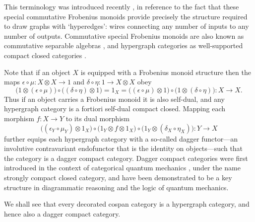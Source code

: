 This terminology was introduced recently \cite{Ki}, in reference to the fact
that these special commutative Frobenius monoids provide precisely the structure
required to draw graphs with `hyperedges': wires connecting any number of
inputs to any number of outputs. Commutative special Frobenius monoids are also
known as commutative separable algebras \cite{RSW}, and hypergraph categories as
well-supported compact closed categories \cite{Ca}.

Note that if an object $X$ is equipped with a Frobenius monoid structure then
the maps $\epsilon \circ \mu\colon  X \otimes X \longrightarrow 1$ and $\delta \circ
\eta\colon  1 \longrightarrow X \otimes X$ obey 
\[
  \big(1 \otimes (\epsilon \circ \mu)\big) \circ \big((\delta \circ \eta)
  \otimes 1\big) = 1_X = \big((\epsilon \circ \mu) \otimes 1\big) \circ \big(1
  \otimes (\delta \circ \eta)\big)\colon X \longrightarrow X.
\]
Thus if an object carries a Frobenius monoid it is also self-dual, and any
hypergraph category is a fortiori self-dual compact closed. Mapping each
morphism $f\colon  X \to Y$ to its dual morphism
\[
  \big((\epsilon_Y \circ \mu_Y) \otimes 1_X\big) \circ \big( 1_Y \otimes f
  \otimes 1_X \big) \circ \big(1_Y \otimes (\delta_X \circ \eta_X)\big)\colon  Y
  \longrightarrow X
\]
further equips each hypergraph category with a so-called dagger functor---an
involutive contravariant endofunctor that is the identity on objects---such that
the category is a dagger compact category. Dagger compact categories were first
introduced in the context of categorical quantum mechanics \cite{AC}, under the
name strongly compact closed category, and have been demonstrated to be a key
structure in diagrammatic reasoning and the logic of quantum mechanics.

We shall see that every decorated cospan category is a hypergraph category, and
hence also a dagger compact category.

